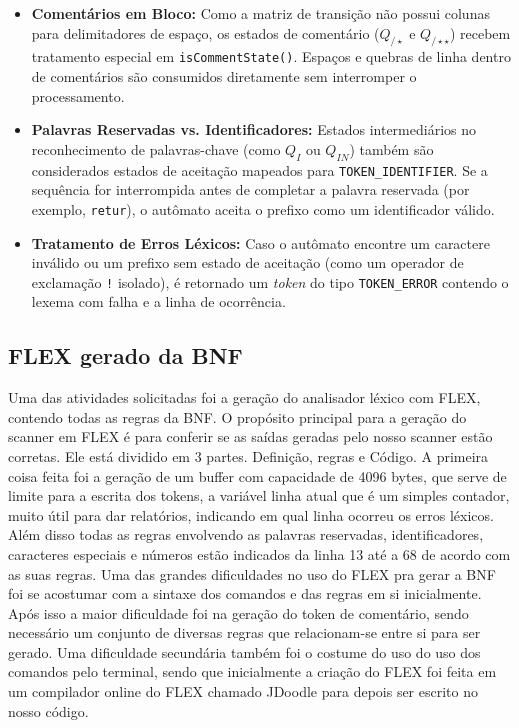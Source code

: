 \documentclass[12pt]{article}
\begin{document}
\begin{itemize}
    \item \textbf{Comentários em Bloco:} Como a matriz de transição não possui colunas para delimitadores de espaço, os estados de comentário ($Q_{/\star}$ e $Q_{/\star\star}$) recebem tratamento especial em \texttt{isCommentState()}. Espaços e quebras de linha dentro de comentários são consumidos diretamente sem interromper o processamento.
    
    \item \textbf{Palavras Reservadas vs. Identificadores:} Estados intermediários no reconhecimento de palavras-chave (como $Q_I$ ou $Q_{IN}$) também são considerados estados de aceitação mapeados para \texttt{TOKEN\_IDENTIFIER}. Se a sequência for interrompida antes de completar a palavra reservada (por exemplo, \texttt{retur}), o autômato aceita o prefixo como um identificador válido.
    
    \item \textbf{Tratamento de Erros Léxicos:} Caso o autômato encontre um caractere inválido ou um prefixo sem estado de aceitação (como um operador de exclamação \texttt{!} isolado), é retornado um \textit{token} do tipo \texttt{TOKEN\_ERROR} contendo o lexema com falha e a linha de ocorrência.
\end{itemize}

\subsection{FLEX gerado da BNF}

Uma das atividades solicitadas foi a geração do analisador léxico com FLEX, contendo todas as regras da BNF. 
O propósito principal para a geração do scanner em FLEX é para conferir se as saídas geradas pelo nosso scanner estão corretas. 
Ele está dividido em 3 partes. Definição, regras e Código. A primeira coisa feita foi a geração de um buffer com capacidade de 4096 bytes, 
que serve de limite para a escrita dos tokens, a variável linha atual que é um simples contador, muito útil para dar relatórios, 
indicando em qual linha ocorreu os erros léxicos. Além disso todas as regras envolvendo as palavras reservadas, identificadores, caracteres especiais e números estão indicados da linha 13 até a 68 de acordo com as suas regras. 
Uma das grandes dificuldades no uso do FLEX pra gerar a BNF foi se acostumar com a sintaxe dos comandos e das regras em si inicialmente. 
Após isso a maior dificuldade foi na geração do token de comentário, sendo necessário um conjunto de diversas regras que relacionam-se entre si para ser gerado. 
Uma dificuldade secundária também foi o costume do uso do uso dos comandos pelo terminal, sendo que inicialmente a criação do FLEX foi feita em um compilador online do FLEX chamado JDoodle para depois ser escrito no nosso código.
\end{document}
